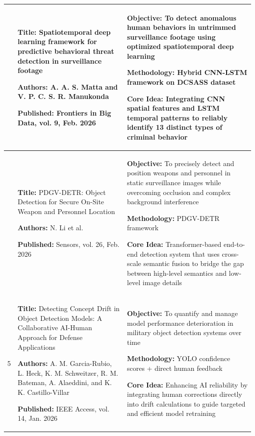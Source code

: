 \begin{longtable}{|>{\centering\arraybackslash}p{1.2cm}|p{6.3cm}|p{6.3cm}|}
  3 &
  \textbf{Title:} Spatiotemporal deep learning framework for predictive behavioral threat detection in surveillance footage \par
  \textbf{Authors:} A. A. S. Matta and V. P. C. S. R. Manukonda \par
  \textbf{Published:} Frontiers in Big Data, vol. 9, Feb. 2026 &
  \textbf{Objective:} To detect anomalous human behaviors in untrimmed surveillance footage using optimized spatiotemporal deep learning \par
  \textbf{Methodology:} Hybrid CNN-LSTM framework on DCSASS dataset \par
  \textbf{Core Idea:} Integrating CNN spatial features and LSTM temporal patterns to reliably identify 13 distinct types of criminal behavior \\
  \hline

  4 &
  \textbf{Title:} PDGV-DETR: Object Detection for Secure On-Site Weapon and Personnel Location \par
  \textbf{Authors:} N. Li et al. \par
  \textbf{Published:} Sensors, vol. 26, Feb. 2026 &
  \textbf{Objective:} To precisely detect and position weapons and personnel in static surveillance images while overcoming occlusion and complex background interference \par
  \textbf{Methodology:} PDGV-DETR framework \par
  \textbf{Core Idea:} Transformer-based end-to-end detection system that uses cross-scale semantic fusion to bridge the gap between high-level semantics and low-level image details \\
  \hline

  5 &
  \textbf{Title:} Detecting Concept Drift in Object Detection Models: A Collaborative AI-Human Approach for Defense Applications \par
  \textbf{Authors:} A. M. Garcia-Rubio, L. Heck, K. M. Schweitzer, R. M. Bateman, A. Alaeddini, and K. K. Castillo-Villar \par
  \textbf{Published:} IEEE Access, vol. 14, Jan. 2026 &
  \textbf{Objective:} To quantify and manage model performance deterioration in military object detection systems over time \par
  \textbf{Methodology:} YOLO confidence scores + direct human feedback \par
  \textbf{Core Idea:} Enhancing AI reliability by integrating human corrections directly into drift calculations to guide targeted and efficient model retraining \\
  \hline


\end{longtable}
